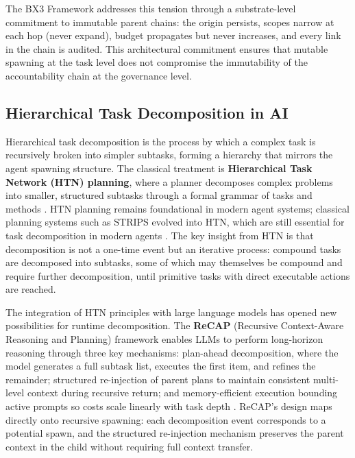 The BX3 Framework addresses this tension through a substrate-level commitment to immutable parent chains: the origin persists, scopes narrow at each hop (never expand), budget propagates but never increases, and every link in the chain is audited. This architectural commitment ensures that mutable spawning at the task level does not compromise the immutability of the accountability chain at the governance level.

\subsection{Hierarchical Task Decomposition in AI}

Hierarchical task decomposition is the process by which a complex task is recursively broken into simpler subtasks, forming a hierarchy that mirrors the agent spawning structure. The classical treatment is \textbf{Hierarchical Task Network (HTN) planning}, where a planner decomposes complex problems into smaller, structured subtasks through a formal grammar of tasks and methods \cite{geeksforgeeks2025htn}. HTN planning remains foundational in modern agent systems; classical planning systems such as STRIPS evolved into HTN, which are still essential for task decomposition in modern agents \cite{1password2025secure}. The key insight from HTN is that decomposition is not a one-time event but an iterative process: compound tasks are decomposed into subtasks, some of which may themselves be compound and require further decomposition, until primitive tasks with direct executable actions are reached.

The integration of HTN principles with large language models has opened new possibilities for runtime decomposition. The \textbf{ReCAP} (Recursive Context-Aware Reasoning and Planning) framework enables LLMs to perform long-horizon reasoning through three key mechanisms: plan-ahead decomposition, where the model generates a full subtask list, executes the first item, and refines the remainder; structured re-injection of parent plans to maintain consistent multi-level context during recursive return; and memory-efficient execution bounding active prompts so costs scale linearly with task depth \cite{recap2025neurips}. ReCAP's design maps directly onto recursive spawning: each decomposition event corresponds to a potential spawn, and the structured re-injection mechanism preserves the parent context in the child without requiring full context transfer.

